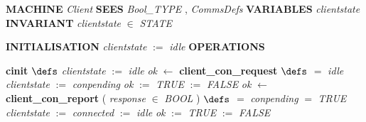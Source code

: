 %
\bsetindent
\begin{tabbing}
\bSetTabs
%
%
\bbnl
{\bf MACHINE} \+ \bbnl
{\em Client\/} \-\label{Client}
%
%
\bbnl
{\bf SEES} \+ \bbnl
{\em Bool\_TYPE\/}\label{Bool_TYPE}  , {\em CommsDefs\/}\label{CommsDefs}  \-
%
%
\bbnl
{\bf VARIABLES} \+ \bbnl
{\em clientstate\/}\label{clientstate}  \-
%
%
\bbnl
{\bf INVARIANT} \+ \bbnl
{\em clientstate\/} $\in$ {\em STATE\/}\label{STATE}
\end{tabbing}
\bresetindent
%
%
\vspace{-4.5ex}\bsetindent
\begin{tabbing}
\bSetTabs
\+\> \-
%
%
\bbnl
{\bf INITIALISATION} \+ \bbnl
{\em clientstate\/} $:=$  {\em idle\/} \-
%
%
\bnl\bnl
{\bf OPERATIONS} \+ \bbnl

%
%
{\bf { cinit}}  \bhsp $\defs$ \+ \bnl
{\em clientstate\/} $:=$  {\em idle\/} \- \bOperationSemiColon \bbnl
%
%
{\em ok\/} $\longleftarrow$  {\bf { client\_con\_request}}  \bhsp $\defs$ \+ \bnl
   $=$ {\em idle\/} \- \bhsp {} \+\bnl
{\em clientstate\/} $:=$  {\em conpending\/} \bparallel \bnl
{\em ok\/} $:=$  {\em TRUE\/} \-\bnl
{}  $:=$  {\em FALSE\/} \-\bnl
{}  \- \bOperationSemiColon \bbnl
%
%
{\em ok\/} $\longleftarrow$  {\bf { client\_con\_report}} ( {\em response\/} $\in$ {\em BOOL\/}\label{BOOL}  ) \bhsp $\defs$ \+ \bnl
   $=$ {\em conpending\/} \- \bhsp {} \+\bnl
{}  $=$ {\em TRUE\/} \- \bhsp {} \+\bnl
{\em clientstate\/} $:=$  {\em connected\/} \-\bnl
{}  $:=$  {\em idle\/} \-\bnl
{}  \bparallel \bnl
{\em ok\/} $:=$  {\em TRUE\/} \-\bnl
{}  $:=$  {\em FALSE\/} \-\bnl
{}  \- \bOperationSemiColon 
\end{tabbing}
